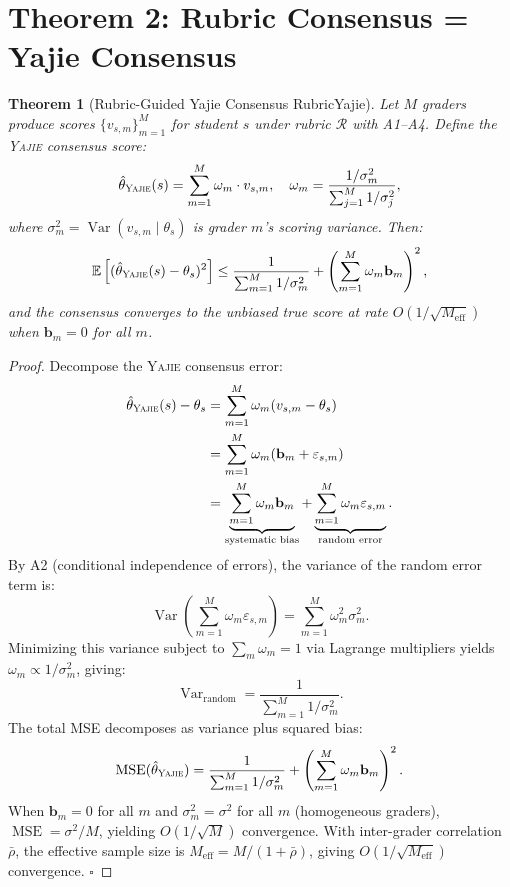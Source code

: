 \documentclass[11pt,a4paper]{article}
\newtheorem{theorem}{Theorem}[section]
\theoremstyle{definition}
\theoremstyle{remark}
\newcommand{\Yajie}{\textsc{Yajie}}
\DeclareMathOperator{\Var}{Var}
\DeclareMathOperator{\MSE}{MSE}
\newcommand{\E}{\mathbb{E}}
\newcommand{\cR}{\mathcal{R}}
\newcommand{\rubric}{\cR}
\newcommand{\trueScore}{\theta}
\newcommand{\biasVec}{\mathbf{b}}
\begin{document}
\section{Theorem 2: Rubric Consensus = Yajie Consensus}
\label{sec:theorem2}
\begin{theorem}[Rubric-Guided Yajie Consensus RubricYajie]
\label{thm:rubric_yajie}
Let $M$ graders produce scores $\{v_{s,m}\}_{m=1}^M$ for student $s$ under rubric $\rubric$ with A1--A4. Define the \Yajie{} consensus score:
\begin{equation}
    \hat{\theta}_{\Yajie}(s) = \sum_{m=1}^M \omega_m \cdot v_{s,m}, \quad \omega_m = \frac{1/\sigma_m^2}{\sum_{j=1}^M 1/\sigma_j^2},
\end{equation}
where $\sigma_m^2 = \Var(v_{s,m} \mid \trueScore_s)$ is grader $m$'s scoring variance. Then:
\begin{equation}
    \E\left[(\hat{\theta}_{\Yajie}(s) - \trueScore_s)^2\right] \le \frac{1}{\sum_{m=1}^M 1/\sigma_m^2} + \left(\sum_{m=1}^M \omega_m \biasVec_m\right)^2,
    \label{eq:yajie_mse}
\end{equation}
and the consensus converges to the unbiased true score at rate $O(1/\sqrt{M_{\text{eff}}})$ when $\biasVec_m = 0$ for all $m$.
\end{theorem}
\begin{proof}
Decompose the \Yajie{} consensus error:
\begin{align}
    \hat{\theta}_{\Yajie}(s) - \trueScore_s &= \sum_{m=1}^M \omega_m (v_{s,m} - \trueScore_s) \\
    &= \sum_{m=1}^M \omega_m (\biasVec_m + \varepsilon_{s,m}) \\
    &= \underbrace{\sum_{m=1}^M \omega_m \biasVec_m}_{\text{systematic bias}} + \underbrace{\sum_{m=1}^M \omega_m \varepsilon_{s,m}}_{\text{random error}}.
\end{align}
By A2 (conditional independence of errors), the variance of the random error term is:
\begin{equation}
    \Var\left(\sum_{m=1}^M \omega_m \varepsilon_{s,m}\right) = \sum_{m=1}^M \omega_m^2 \sigma_m^2.
\end{equation}
Minimizing this variance subject to $\sum_m \omega_m = 1$ via Lagrange multipliers yields $\omega_m \propto 1/\sigma_m^2$, giving:
\begin{equation}
    \Var_{\text{random}} = \frac{1}{\sum_{m=1}^M 1/\sigma_m^2}.
\end{equation}
The total MSE decomposes as variance plus squared bias:
\begin{equation}
    \MSE(\hat{\theta}_{\Yajie}) = \frac{1}{\sum_{m=1}^M 1/\sigma_m^2} + \left(\sum_{m=1}^M \omega_m \biasVec_m\right)^2.
\end{equation}
When $\biasVec_m = 0$ for all $m$ and $\sigma_m^2 = \sigma^2$ for all $m$ (homogeneous graders), $\MSE = \sigma^2/M$, yielding $O(1/\sqrt{M})$ convergence. With inter-grader correlation $\bar{\rho}$, the effective sample size is $M_{\text{eff}} = M/(1 + \bar{\rho})$, giving $O(1/\sqrt{M_{\text{eff}}})$ convergence. \hfill $\square$
\end{proof}
\end{document}
